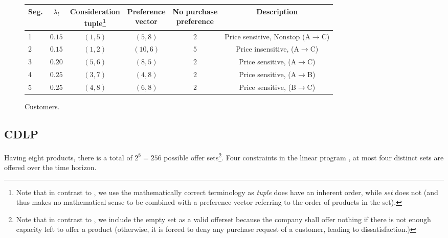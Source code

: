 \begin{figure}
	\begin{subtable}{\linewidth}
		\caption{Customers.\label{tb-Example0-Customers}}
		\small
		\centering
		\begin{tabular}{lccccc}
			\toprule
			Seg. & $\lambda_l$ & \specialcell[b]{Consideration\\tuple\footnote{Note that in contrast to \cite{Bront.2009}, we use the mathematically correct terminology as \emph{tuple} does have an inherent order, while \emph{set} does not (and thus makes no mathematical sense to be combined with a preference vector referring to the order of products in the set).}} & \specialcell[b]{Preference \\vector} & \specialcell[b]{No purchase \\preference} & Description\\
			\midrule
			1 & $0.15$ & $(1, 5)$ & $(5, 8)$ & $2$ & Price sensitive, Nonstop (A$\rightarrow$C)\\
			2 & $0.15$ & $(1, 2)$ & $(10, 6)$ & $5$ & Price insensitive, (A$\rightarrow$C)\\
			3 & $0.20$ & $(5, 6)$ & $(8, 5)$ & $2$ & Price sensitive, (A$\rightarrow$C)\\
			4 & $0.25$ & $(3, 7)$ & $(4, 8)$ & $2$ & Price sensitive, (A$\rightarrow$B)\\
			5 & $0.25$ & $(4, 8)$ & $(6, 8)$ & $2$ & Price sensitive, (B$\rightarrow$C)\\
			\bottomrule
		\end{tabular}
	\end{subtable}
\end{figure}


\subsection{CDLP}

Having eight products, there is a total of $2^8 = 256$ possible offer sets\footnote{Note that in contrast to \cite{Bront.2009}, we include the empty set as a valid offerset because the company shall offer nothing if there is not enough capacity left to offer a product (otherwise, it is forced to deny any purchase request of a customer, leading to dissatisfaction.)}. Four constraints in the linear program , at most four distinct sets are offered over the time horizon. 

